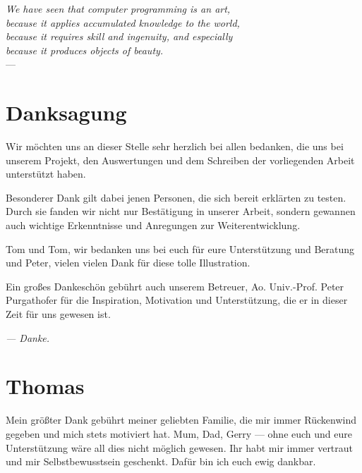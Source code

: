 
\begin{flushright}{\slshape    
    We have seen that computer programming is an art, \\ 
    because it applies accumulated knowledge to the world, \\ 
    because it requires skill and ingenuity, and especially \\
    because it produces objects of beauty.} \\ \medskip
    ---  \citep{knuth:1974}
\end{flushright}

\bigskip

\begingroup
\let\clearpage\relax
\let\cleardoublepage\relax
\let\cleardoublepage\relax
\chapter*{Danksagung}
Wir möchten uns an dieser Stelle sehr herzlich bei allen bedanken, die uns bei unserem Projekt, den Auswertungen und dem Schreiben der vorliegenden Arbeit unterstützt haben. 

Besonderer Dank gilt dabei jenen Personen, die sich bereit erklärten \scribbler zu testen. Durch sie fanden wir nicht nur Bestätigung in unserer Arbeit, sondern gewannen auch wichtige Erkenntnisse und Anregungen zur Weiterentwicklung.

Tom und Tom, wir bedanken uns bei euch für eure Unterstützung und Beratung und Peter, vielen vielen Dank für diese tolle Illustration.

Ein großes Dankeschön gebührt auch unserem Betreuer, Ao. Univ.-Prof. Peter Purgathofer für die Inspiration, Motivation und Unterstützung, die er in dieser Zeit für uns gewesen ist.

\medskip \noindent \emph{--- Danke.}

\pagebreak

\chapter*{Thomas}
Mein größter Dank gebührt meiner geliebten Familie, die mir immer Rückenwind gegeben und mich stets motiviert hat. Mum, Dad, Gerry --- ohne euch und eure Unterstützung wäre all dies nicht möglich gewesen. Ihr habt mir immer vertraut und mir Selbstbewusstsein geschenkt. Dafür bin ich euch ewig dankbar.

